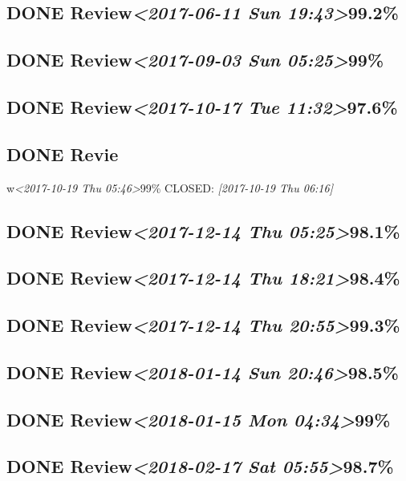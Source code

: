 \documentclass[11pt]{ctexart}
\begin{document}
\subsection{{\bfseries\sffamily DONE} Review\textit{<2017-06-11 Sun 19:43>}99.2\%}
\label{sec:orgaf92c9b}
\subsection{{\bfseries\sffamily DONE} Review\textit{<2017-09-03 Sun 05:25>}99\%}
\label{sec:orgfa95a66}
\subsection{{\bfseries\sffamily DONE} Review\textit{<2017-10-17 Tue 11:32>}97.6\%}
\label{sec:org63ec75a}
\subsection{{\bfseries\sffamily DONE} Revie}
\label{sec:orgfdfbe7b}
w\textit{<2017-10-19 Thu 05:46>}99\%
   CLOSED: \textit{[2017-10-19 Thu 06:16]}

\subsection{{\bfseries\sffamily DONE} Review\textit{<2017-12-14 Thu 05:25>}98.1\%}
\label{sec:orgd5d7575}
\subsection{{\bfseries\sffamily DONE} Review\textit{<2017-12-14 Thu 18:21>}98.4\%}
\label{sec:orgec3fd59}
\subsection{{\bfseries\sffamily DONE} Review\textit{<2017-12-14 Thu 20:55>}99.3\%}
\label{sec:org7d34c78}
\subsection{{\bfseries\sffamily DONE} Review\textit{<2018-01-14 Sun 20:46>}98.5\%}
\label{sec:org574d519}
\subsection{{\bfseries\sffamily DONE} Review\textit{<2018-01-15 Mon 04:34>}99\%}
\label{sec:orged033be}
\subsection{{\bfseries\sffamily DONE} Review\textit{<2018-02-17 Sat 05:55>}98.7\%}
\label{sec:org36faf8f}
\end{document}
